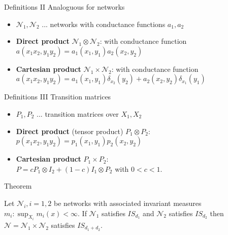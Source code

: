 \documentclass{beamer}\usepackage[]{graphicx}\usepackage[]{color}
\begin{document}
\begin{frame}[fragile]{Definitions II}
Analoguous for networks
\begin{itemize}
\item $\mathcal{N}_1, \mathcal{N}_2$ ... networks with conductance functions $a_1, a_2$
\item \textbf{Direct product} $\mathcal{N}_1 \otimes \mathcal{N}_2$: with conductance function\\
$a(x_1 x_2, y_1 y_2) =  a_1(x_1, y_1)a_2(x_2, y_2)$
\item \textbf{Cartesian product} $\mathcal{N}_1 \times \mathcal{N}_2$: with conductance function\\
$a(x_1 x_2, y_1 y_2) =  a_1(x_1, y_1)\delta_{x_2}(y_2) + a_2(x_2, y_2)\delta_{x_1}(y_1)$
\end{itemize}
\end{frame}

\begin{frame}[fragile]{Definitions III}
Transition matrices
\begin{itemize}
\item $P_1, P_2$ ... transition matrices over $X_1, X_2$
\item \textbf{Direct product} (tensor product) $P_1 \otimes P_2$:\\
$p(x_1 x_2, y_1 y_2) =  p_1(x_1, y_1)p_2(x_2, y_2)$
\item \textbf{Cartesian product} $P_1 \times P_2$:\\
$P = c P_1 \otimes I_2 + (1 - c) I_1 \otimes P_2$ with $0<c<1$.
\end{itemize}
\end{frame}

\begin{frame}[fragile]{Theorem}
\begin{theorem}
Let $\mathcal{N}_i,i=1,2$ be networks with associated invariant measures $m_i: \sup_{X_i} m_i(x)<\infty$. If $\mathcal{N}_1$ satisfies $IS_{d_1}$ and $\mathcal{N}_2$ satisfies $IS_{d_2}$ then $\mathcal{N} = \mathcal{N}_1 \times \mathcal{N}_2$ satisfies $IS_{d_1+d_2}$.
\end{theorem}
\end{frame}
\end{document}
